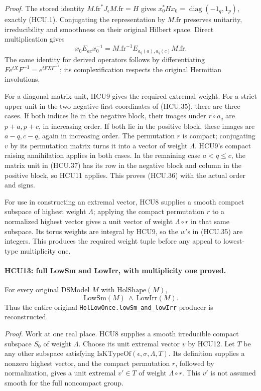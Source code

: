 \emph{Proof.}
The stored identity
\(M.\mathrm{fr}^*J_\epsilon M.\mathrm{fr}=H\) gives
\(x_0^*Hx_0=\operatorname{diag}(-1_q,1_p)\), exactly (HCU.1).
Conjugating the representation by \(M.\mathrm{fr}\) preserves
unitarity, irreducibility and smoothness on their original Hilbert
space.  Direct multiplication gives
\[
 x_0E_{ac}x_0^{-1}
    =M.\mathrm{fr}^{-1}E_{a_q(a),a_q(c)}M.\mathrm{fr}.
 \tag{HCU.37}
\]
The same identity for derived operators follows by differentiating
\(F e^{tX}F^{-1}=e^{tFXF^{-1}}\); its complexification respects
the original Hermitian involutions.

For a diagonal matrix unit, HCU9 gives the required extremal weight.
For a strict upper unit in the two negative-first coordinates of
(HCU.35), there are three cases.
If both indices lie in the negative block, their images under
\(r\circ a_q\) are \(p+a,p+c\), in increasing order.
If both lie in the positive block, these images are \(a-q,c-q\),
again in increasing order.  The permutation \(r\) is compact;
conjugating \(v\) by its permutation matrix turns it into a vector
of weight \(\Lambda\).  HCU9's compact raising annihilation applies
in both cases.  In the remaining case \(a<q\le c\), the matrix unit
in (HCU.37) has its row in the negative block and column in the
positive block, so HCU11 applies.
This proves (HCU.36) with the actual order and signs.

For use in constructing an extremal vector, HCU8 supplies a smooth
compact subspace of highest weight \(\Lambda\); applying the compact
permutation \(r\) to a normalized highest vector gives a unit vector
of weight \(\Lambda\circ r\) in that same subspace.
Its torus weights are integral by HCU9, so the \(w\)'s in (HCU.35)
are integers.  This produces the required weight tuple before
any appeal to lowest-type multiplicity one.

\paragraph{HCU13: full LowSm and LowIrr, with multiplicity one proved.}
\label{claim:HCU13}
For every original DSModel \(M\) with \(\mathrm{HolShape}(M)\),
\[
 \mathrm{LowSm}(M)\ \wedge\ \mathrm{LowIrr}(M).
 \tag{HCU.38}
\]
Thus the entire original
\texttt{HolLowOnce.lowSm\_and\_lowIrr} producer is reconstructed.

\emph{Proof.}
Work at one real place.  HCU8 supplies a smooth irreducible compact
subspace \(S_0\) of weight \(\Lambda\).
Choose its unit extremal vector \(v\) by HCU12.
Let \(T\) be any other subspace satisfying
\(\mathrm{IsKTypeOf}(\epsilon,\sigma,\Lambda,T)\).
Its definition supplies a nonzero highest vector, and the compact
permutation \(r\), followed by normalization, gives a unit extremal
\(v'\in T\) of weight \(\Lambda\circ r\).
This \(v'\) is not assumed smooth for the full noncompact group.

